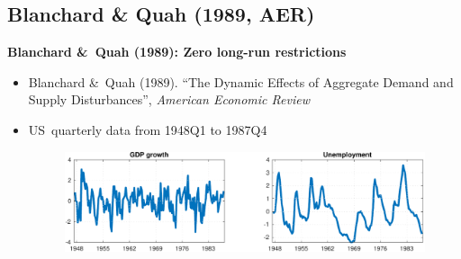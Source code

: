 \documentclass[10pt,english,t,aspectratio=169,ignorenonframetext]{beamer}
\begin{document}

\subsection{Blanchard \& Quah (1989, AER)}

\begin{frame}
\vspace{3cm} \color{title}%
\bigskip

\color{note}
\end{frame}


\begin{frame}
{\textbf{Blanchard \&\ Quah (1989): Zero long-run restrictions}}

\begin{itemize}
\item Blanchard \&\ Quah (1989). \textquotedblleft The Dynamic Effects of
Aggregate Demand and Supply Disturbances\textquotedblright , \emph{American
Economic Review}\bigskip

\item US\ quarterly data from 1948Q1 to 1987Q4\bigskip

\begin{figure}[h]
\includegraphics[width=.85\textwidth]{BQ_DATA.pdf}
\end{figure}
\end{itemize}
\end{frame}

\end{document}
